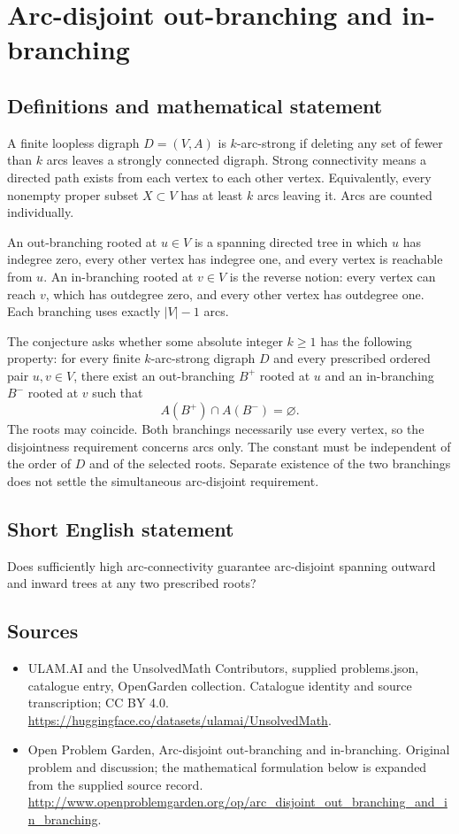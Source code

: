\documentclass[11pt,a4paper]{article}
\begin{document}
\section*{Arc-disjoint out-branching and in-branching}\label{statement}

\subsection{Definitions and mathematical statement}
A finite loopless digraph $D=(V,A)$ is $k$-arc-strong if deleting any set
of fewer than $k$ arcs leaves a strongly connected digraph. Strong
connectivity means a directed path exists from each vertex to each
other vertex. Equivalently, every nonempty proper subset $X\subset V$
has at least $k$ arcs leaving it. Arcs are counted individually.

An out-branching rooted at $u\in V$ is a spanning directed tree in which
$u$ has indegree zero, every other vertex has indegree one, and every
vertex is reachable from $u$. An in-branching rooted at $v\in V$ is the
reverse notion: every vertex can reach $v$, which has outdegree zero,
and every other vertex has outdegree one. Each branching uses exactly
$|V|-1$ arcs.

The conjecture asks whether some absolute integer $k\ge1$ has the
following property: for every finite $k$-arc-strong digraph $D$ and every
prescribed ordered pair $u,v\in V$, there exist an out-branching $B^+$
rooted at $u$ and an in-branching $B^-$ rooted at $v$ such that
\[
                              A(B^+)\cap A(B^-)=\varnothing.
\]
The roots may coincide. Both branchings necessarily use every vertex,
so the disjointness requirement concerns arcs only. The constant must
be independent of the order of $D$ and of the selected roots. Separate
existence of the two branchings does not settle the simultaneous
arc-disjoint requirement.
\subsection{Short English statement}
Does sufficiently high arc-connectivity guarantee arc-disjoint spanning outward and inward trees at any two prescribed roots?
\subsection{Sources}
\begin{itemize}
\item[S1] ULAM.AI and the UnsolvedMath Contributors, supplied problems.json, catalogue entry, OpenGarden collection. Catalogue identity and source transcription; CC BY 4.0.
\url{https://huggingface.co/datasets/ulamai/UnsolvedMath}.
\item[S2] Open Problem Garden, Arc-disjoint out-branching and in-branching. Original problem and discussion; the mathematical formulation below is expanded from the supplied source record.
\url{http://www.openproblemgarden.org/op/arc_disjoint_out_branching_and_in_branching}.
\end{itemize}
\end{document}
